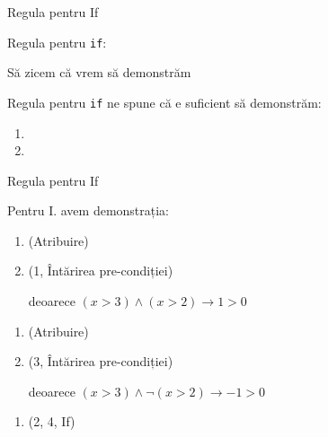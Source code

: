 \begin{frame}{Regula pentru If}

\alert{Regula pentru {\tt if}:}
\begin{center}
\end{center}

\begin{example}

Să zicem că vrem să demonstrăm

\begin{center}
\end{center}
\pause
Regula pentru {\tt if} ne spune că e suficient să demonstrăm:
\begin{enumerate}[I]
	\item {}
	\item {}
\end{enumerate}
\end{example}
\end{frame}

\begin{frame}{Regula pentru If}

\begin{example}[cont.]
Pentru I.  avem demonstrația:
\begin{enumerate}[<+->]
	\item {} \hfill (Atribuire)
	\item {}  \hfill (1, Întărirea pre-condiției)

	deoarece $(x>3) \wedge (x > 2) \to 1>0$
\end{enumerate}

\medskip
{}
\begin{enumerate}[<+->]
{\setcounter{enumi}{2}}
	\item {} \hfill (Atribuire)
	\item {}  \hfill (3, Întărirea pre-condiției)

	   deoarece $(x>3) \wedge \neg(x>2) \to -1 > 0 $
\end{enumerate}

\medskip
{}
\begin{enumerate}[<+->]
	{\setcounter{enumi}{4}}
	\item {} \hfill (2, 4, If)
\end{enumerate}
\end{example}
\end{frame}

